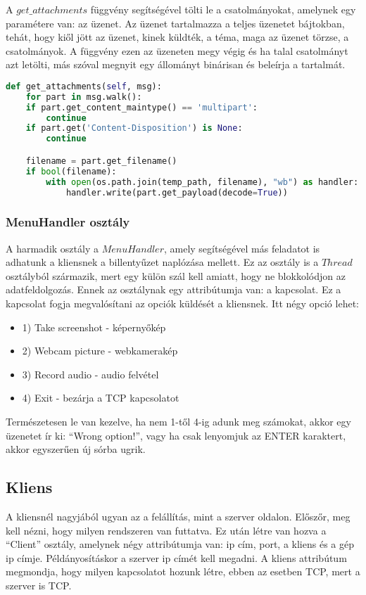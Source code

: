 \documentclass[a4paper, 11pt]{article}
\begin{document}
A $get\_attachments$ függvény segítségével tölti le a csatolmányokat, amelynek egy paramétere van: az üzenet. Az üzenet tartalmazza a teljes üzenetet bájtokban, tehát, hogy kiől jött az üzenet, kinek küldték, a téma, maga az üzenet törzse, a csatolmányok. A függvény ezen az üzeneten megy végig és ha talal csatolmányt azt letölti, más szóval megnyit egy állományt binárisan és beleírja a tartalmát.
\begin{lstlisting}[language=Python]
def get_attachments(self, msg):
	for part in msg.walk():
	if part.get_content_maintype() == 'multipart':
		continue
	if part.get('Content-Disposition') is None:
		continue

	filename = part.get_filename()
	if bool(filename):
		with open(os.path.join(temp_path, filename), "wb") as handler:
			handler.write(part.get_payload(decode=True))
\end{lstlisting}

\subsubsection{MenuHandler osztály}\label{subsubsec:menuhandler}
A harmadik osztály a $MenuHandler$, amely segítségével más feladatot is adhatunk a kliensnek a billentyűzet naplózása mellett. Ez az osztály is a $Thread$ osztályból származik, mert egy külön szál kell amiatt, hogy ne blokkolódjon az adatfeldolgozás. Ennek az osztálynak egy attribútumja van: a kapcsolat. Ez a kapcsolat fogja megvalósítani az opciók küldését a kliensnek. Itt négy opció lehet:
\begin{itemize}
\item 1) Take screenshot - képernyőkép
\item 2) Webcam picture - webkamerakép
\item 3) Record audio - audio felvétel
\item 4) Exit - bezárja a TCP kapcsolatot
\end{itemize}
Természetesen le van kezelve, ha nem 1-től 4-ig adunk meg számokat, akkor egy üzenetet ír ki: ``Wrong option!'', vagy ha csak lenyomjuk az ENTER karaktert, akkor egyszerűen új sórba ugrik.

\subsection{Kliens}\label{subsec:client}
A kliensnél nagyjából ugyan az a felállítás, mint a szerver oldalon. Előszőr, meg kell nézni, hogy milyen rendszeren van futtatva. Ez után létre van hozva a ``Client'' osztály, amelynek négy attribútumja van: ip cím, port, a kliens és a gép ip címje. Példányosításkor a szerver ip címét kell megadni. A kliens attribútum megmondja, hogy milyen kapcsolatot hozunk létre, ebben az esetben TCP, mert a szerver is TCP.
\end{document}
